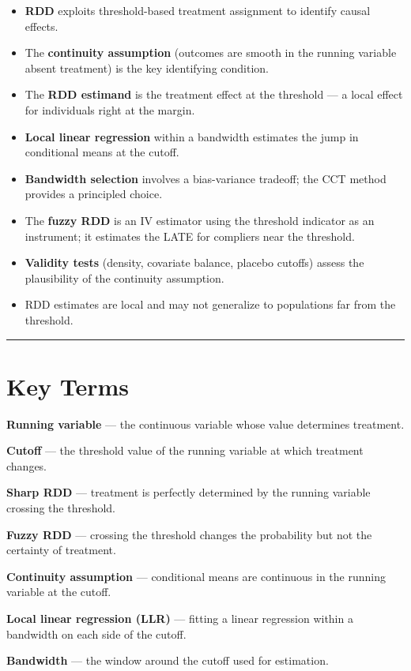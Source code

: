 \begin{itemize}
\item \textbf{RDD} exploits threshold-based treatment assignment to identify causal effects.
\item The \textbf{continuity assumption} (outcomes are smooth in the running variable absent treatment) is the key identifying condition.
\item The \textbf{RDD estimand} is the treatment effect at the threshold --- a local effect for individuals right at the margin.
\item \textbf{Local linear regression} within a bandwidth estimates the jump in conditional means at the cutoff.
\item \textbf{Bandwidth selection} involves a bias-variance tradeoff; the CCT method provides a principled choice.
\item The \textbf{fuzzy RDD} is an IV estimator using the threshold indicator as an instrument; it estimates the LATE for compliers near the threshold.
\item \textbf{Validity tests} (density, covariate balance, placebo cutoffs) assess the plausibility of the continuity assumption.
\item RDD estimates are local and may not generalize to populations far from the threshold.
\end{itemize}

\medskip\hrule\medskip

\section{Key Terms}

\textbf{Running variable} --- the continuous variable whose value determines treatment.

\textbf{Cutoff} --- the threshold value of the running variable at which treatment changes.

\textbf{Sharp RDD} --- treatment is perfectly determined by the running variable crossing the threshold.

\textbf{Fuzzy RDD} --- crossing the threshold changes the probability but not the certainty of treatment.

\textbf{Continuity assumption} --- conditional means are continuous in the running variable at the cutoff.

\textbf{Local linear regression (LLR)} --- fitting a linear regression within a bandwidth on each side of the cutoff.

\textbf{Bandwidth} --- the window around the cutoff used for estimation.


